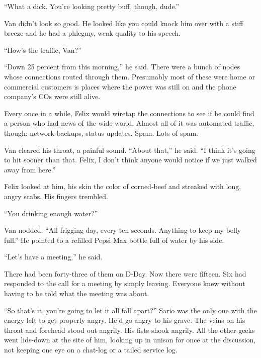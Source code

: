 “What a dick. You’re looking pretty buff, though, dude.”

Van didn’t look so good. He looked like you could knock him over
with a stiff breeze and he had a phlegmy, weak quality to his
speech.

“How’s the traffic, Van?”

“Down 25 percent from this morning,” he said. There were a bunch of
nodes whose connections routed through them. Presumably most of
these were home or commercial customers is places where the power
was still on and the phone company’s COs were still alive.

Every once in a while, Felix would wiretap the connections to see
if he could find a person who had news of the wide world. Almost
all of it was automated traffic, though: network backups, status
updates. Spam. Lots of spam.

Van cleared his throat, a painful sound. “About that,” he said. “I
think it’s going to hit sooner than that. Felix, I don’t think
anyone would notice if we just walked away from here.”

Felix looked at him, his skin the color of corned-beef and streaked
with long, angry scabs. His fingers trembled.

“You drinking enough water?”

Van nodded. “All frigging day, every ten seconds. Anything to keep
my belly full.” He pointed to a refilled Pepsi Max bottle full of
water by his side.

“Let’s have a meeting,” he said.

\tb

There had been forty-three of them on D-Day. Now there were
fifteen. Six had responded to the call for a meeting by simply
leaving. Everyone knew without having to be told what the meeting
was about.

“So that’s it, you’re going to let it all fall apart?” Sario was
the only one with the energy left to get properly angry. He’d go
angry to his grave. The veins on his throat and forehead stood out
angrily. His fists shook angrily. All the other geeks went
lids-down at the site of him, looking up in unison for once at the
discussion, not keeping one eye on a chat-log or a tailed service
log.

